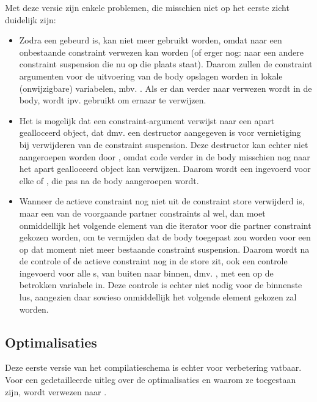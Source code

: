 Met deze versie zijn enkele problemen, die misschien niet op het eerste zicht duidelijk zijn: \begin{itemize}
  \item Zodra een  gebeurd is, kan  niet meer gebruikt worden, omdat naar een onbestaande constraint verwezen kan worden (of erger nog: naar een andere constraint suspension die nu op die plaats staat). Daarom zullen de constraint argumenten voor de uitvoering van de body opslagen worden in lokale (onwijzigbare) variabelen, mbv. . Als er dan verder naar verwezen wordt in de body, wordt  ipv.  gebruikt om ernaar te verwijzen.
  \item Het is mogelijk dat een constraint-argument verwijst naar een apart gealloceerd object, dat dmv. een destructor aangegeven is voor vernietiging bij verwijderen van de constraint suspension. Deze destructor kan echter niet aangeroepen worden door , omdat code verder in de body misschien nog naar het apart gealloceerd object kan verwijzen. Daarom wordt een  ingevoerd voor elke  of , die pas na de body aangeroepen wordt.
  \item Wanneer de actieve constraint nog niet uit de constraint store verwijderd is, maar een van de voorgaande partner constraints al wel, dan moet onmiddellijk het volgende element van die iterator voor die partner constraint gekozen worden, om te vermijden dat de body toegepast zou worden voor een op dat moment niet meer bestaande constraint suspension. Daarom wordt na de controle of de actieve constraint nog in de store zit, ook een controle ingevoerd voor alle s, van buiten naar binnen, dmv. , met een  op de betrokken variabele in. Deze controle is echter niet nodig voor de binnenste lus, aangezien daar sowieso onmiddellijk het volgende element gekozen zal worden.
\end{itemize}

\subsection{Optimalisaties} \label{sec:optim}

Deze eerste versie van het compilatieschema is echter voor verbetering vatbaar. Voor een gedetailleerde uitleg over de optimalisaties en waarom ze toegestaan zijn, wordt verwezen naar \cite{tomsphdthesis}. 

